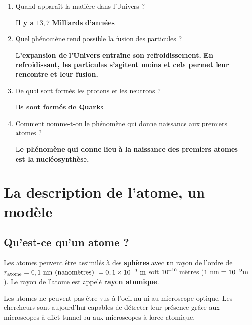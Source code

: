 \documentclass[french]{article}
\begin{document}
\begin{enumerate}
	\item Quand apparaît la matière dans l'Univers ? 
	
	\textbf{Il y a $13,7$ Milliards d'années}%

	\item Quel phénomène rend possible la fusion des particules ?
	
	\textbf{L'expansion de l'Univers entraîne son refroidissement. En refroidissant, les particules s'agitent moins et cela permet leur rencontre et leur fusion.}\bigskip

	\item De quoi sont formés les protons et les neutrons ?
	
	
	\textbf{Ils sont formés de Quarks}

	\item Comment nomme-t-on le phénomène qui donne naissance aux premiers atomes ?
	
	\textbf{Le phénomène qui donne lieu à la naissance des premiers atomes est la nucléosynthèse.}

\end{enumerate}



\section{La description de l'atome, un modèle}
\subsection{Qu'est-ce qu'un atome ? }

Les atomes peuvent être assimilés à des \textbf{sphères} avec un rayon de l'ordre de \textbf{$r_{\rm atome} = 0,1~\rm nm \text{ (nanomètres) }= 0,1\times 10^{-9}~\rm m$ } soit $10^{-10}$ mètres ($1\rm ~nm = 10^{-9} m$). Le rayon de l'atome est appelé \textbf{rayon atomique}.\medskip

Les atomes ne peuvent pas être vus à l'oeil nu ni au microscope optique. Les chercheurs sont aujourd'hui capables de détecter leur présence grâce aux microscopes à effet tunnel ou aux microscopes à force atomique.\medskip
\end{document}

